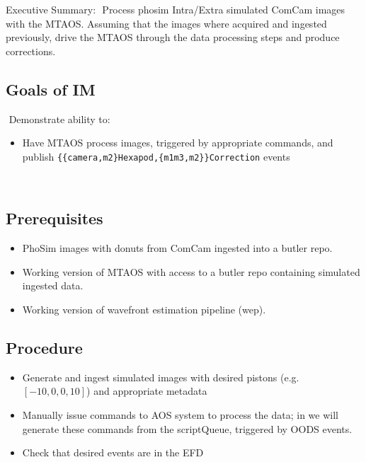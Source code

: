 Executive Summary:
​
Process phosim Intra/Extra simulated ComCam images with the MTAOS.
Assuming that the images where acquired and ingested previously, drive the MTAOS through the data processing steps and produce corrections.
​
\subsection{Goals of IM}
​
Demonstrate ability to:
​
\begin{itemize}
\item Have MTAOS process images, triggered by appropriate commands, and publish
  \texttt{\{\{camera,m2\}Hexapod,\{m1m3,m2\}\}Correction} events
\end{itemize}
​
\subsection{Prerequisites}
\begin{itemize}
\item PhoSim images with donuts from ComCam ingested into a butler repo.
\item Working version of MTAOS with access to a butler repo containing simulated ingested data.
\item Working version of wavefront estimation pipeline (wep). 
\end{itemize}

\subsection{Procedure}
\begin{itemize}
\item Generate and ingest simulated images with desired pistons (e.g. $[-10, 0, 0, 10]$) and appropriate
  metadata
\item Manually issue commands to AOS system to process the data; in  we will generate these
  commands from the \gls{scriptQueue}, triggered by \gls{OODS} events.
\item Check that desired events are in the EFD
\end{itemize}
